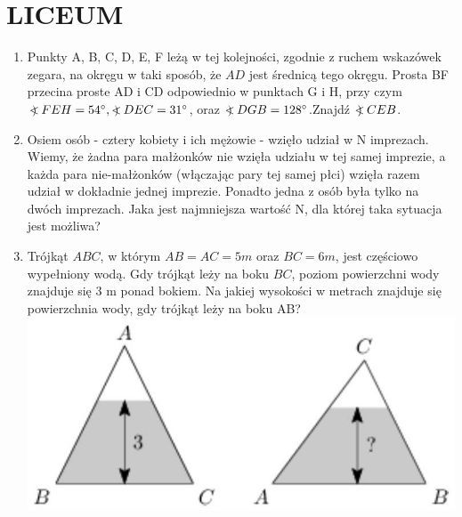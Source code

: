 \documentclass[10pt]{article}
\newcommand\Varangle{\mathop{{<\!\!\!\!\!\text{\small)}}\:}\nolimits}
\begin{document}
\section*{LICEUM}
\begin{enumerate}
  \item Punkty A, B, C, D, E, F leżą w tej kolejności, zgodnie z ruchem wskazówek zegara, na okręgu w taki sposób, że \(A D\) jest średnicą tego okręgu. Prosta BF przecina proste AD i CD odpowiednio w punktach G i H, przy czym \(\Varangle F E H=54^{\circ}, \Varangle D E C=31^{\circ}\), oraz \(\Varangle D G B=128^{\circ}\).Znajdź \(\Varangle C E B\).
  \item Osiem osób - cztery kobiety i ich mężowie - wzięło udział w N imprezach. Wiemy, że żadna para małżonków nie wzięła udziału w tej samej imprezie, a każda para nie-małżonków (włączając pary tej samej płci) wzięła razem udział w dokładnie jednej imprezie. Ponadto jedna z osób była tylko na dwóch imprezach. Jaka jest najmniejsza wartość N, dla której taka sytuacja jest możliwa?
  \item Trójkąt \(A B C\), w którym \(A B=A C=5 m\) oraz \(B C=6 m\), jest częściowo wypełniony wodą. Gdy trójkąt leży na boku \(B C\), poziom powierzchni wody znajduje się 3 m ponad bokiem. Na jakiej wysokości w metrach znajduje się powierzchnia wody, gdy trójkąt leży na boku AB?\\
\includegraphics[max width=\textwidth, center]{2024_11_21_bd352e229c34ad64190bg-1}
\end{enumerate}
\end{document}
